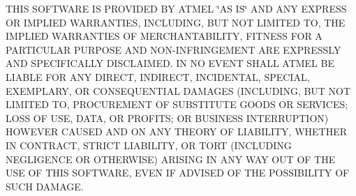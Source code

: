 T\+H\+IS S\+O\+F\+T\+W\+A\+RE IS P\+R\+O\+V\+I\+D\+ED BY A\+T\+M\+EL \char`\"{}\+A\+S I\+S\char`\"{} A\+ND A\+NY E\+X\+P\+R\+E\+SS OR I\+M\+P\+L\+I\+ED W\+A\+R\+R\+A\+N\+T\+I\+ES, I\+N\+C\+L\+U\+D\+I\+NG, B\+UT N\+OT L\+I\+M\+I\+T\+ED TO, T\+HE I\+M\+P\+L\+I\+ED W\+A\+R\+R\+A\+N\+T\+I\+ES OF M\+E\+R\+C\+H\+A\+N\+T\+A\+B\+I\+L\+I\+TY, F\+I\+T\+N\+E\+SS F\+OR A P\+A\+R\+T\+I\+C\+U\+L\+AR P\+U\+R\+P\+O\+SE A\+ND N\+O\+N-\/\+I\+N\+F\+R\+I\+N\+G\+E\+M\+E\+NT A\+RE E\+X\+P\+R\+E\+S\+S\+LY A\+ND S\+P\+E\+C\+I\+F\+I\+C\+A\+L\+LY D\+I\+S\+C\+L\+A\+I\+M\+ED. IN NO E\+V\+E\+NT S\+H\+A\+LL A\+T\+M\+EL BE L\+I\+A\+B\+LE F\+OR A\+NY D\+I\+R\+E\+CT, I\+N\+D\+I\+R\+E\+CT, I\+N\+C\+I\+D\+E\+N\+T\+AL, S\+P\+E\+C\+I\+AL, E\+X\+E\+M\+P\+L\+A\+RY, OR C\+O\+N\+S\+E\+Q\+U\+E\+N\+T\+I\+AL D\+A\+M\+A\+G\+ES (I\+N\+C\+L\+U\+D\+I\+NG, B\+UT N\+OT L\+I\+M\+I\+T\+ED TO, P\+R\+O\+C\+U\+R\+E\+M\+E\+NT OF S\+U\+B\+S\+T\+I\+T\+U\+TE G\+O\+O\+DS OR S\+E\+R\+V\+I\+C\+ES; L\+O\+SS OF U\+SE, D\+A\+TA, OR P\+R\+O\+F\+I\+TS; OR B\+U\+S\+I\+N\+E\+SS I\+N\+T\+E\+R\+R\+U\+P\+T\+I\+ON) H\+O\+W\+E\+V\+ER C\+A\+U\+S\+ED A\+ND ON A\+NY T\+H\+E\+O\+RY OF L\+I\+A\+B\+I\+L\+I\+TY, W\+H\+E\+T\+H\+ER IN C\+O\+N\+T\+R\+A\+CT, S\+T\+R\+I\+CT L\+I\+A\+B\+I\+L\+I\+TY, OR T\+O\+RT (I\+N\+C\+L\+U\+D\+I\+NG N\+E\+G\+L\+I\+G\+E\+N\+CE OR O\+T\+H\+E\+R\+W\+I\+SE) A\+R\+I\+S\+I\+NG IN A\+NY W\+AY O\+UT OF T\+HE U\+SE OF T\+H\+IS S\+O\+F\+T\+W\+A\+RE, E\+V\+EN IF A\+D\+V\+I\+S\+ED OF T\+HE P\+O\+S\+S\+I\+B\+I\+L\+I\+TY OF S\+U\+CH D\+A\+M\+A\+GE.